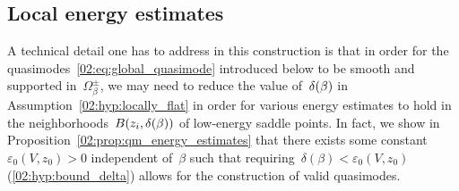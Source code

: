     \subsection{Local energy estimates}
    \label{02:subsec:local_energy_estimates}
            A technical detail one has to address in this construction is that in order for the quasimodes~\eqref{02:eq:global_quasimode} introduced below to be smooth and supported in~$\Omega_\beta^\pm$, we may need to reduce the value of~$\delta(\beta)$ in Assumption~\eqref{02:hyp:locally_flat} in order for various energy estimates to hold in the neighborhoods~$B(z_i,\delta(\beta))$ of low-energy saddle points.
            In fact, we show in Proposition~\ref{02:prop:qm_energy_estimates} that there exists some constant~$\varepsilon_0(V,z_0)>0$ independent of~$\beta$ such that requiring~$\delta(\beta)<\varepsilon_0(V,z_0)$ (\eqref{02:hyp:bound_delta}) allows for the construction of valid quasimodes.
            
